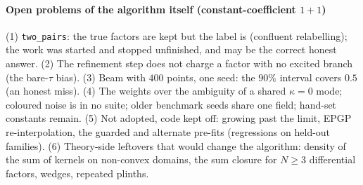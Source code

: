 \paragraph{Open problems of the algorithm itself (constant-coefficient $1{+}1$)} (1) \texttt{two\_pairs}: the true factors are kept but the label is \UND{} (confluent relabelling); the work was started and stopped unfinished, and \UND{} may be the correct honest answer. (2) The refinement step does not charge a factor with no excited branch (the bare-$\tau$ bias). (3) Beam with $400$ points, one seed: the $90\%$ interval covers $0.5$ (an honest miss). (4) The weights over the ambiguity of a shared $\kappa=0$ mode; coloured noise is in no suite; older benchmark seeds share one field; hand-set constants remain.
(5) Not adopted, code kept off: growing past the limit, EPGP re-interpolation, the guarded and alternate pre-fits (regressions on held-out families). (6) Theory-side leftovers that would change the algorithm: density of the sum of kernels on non-convex domains, the sum closure for $N\ge3$ differential factors, wedges, repeated plinths.
